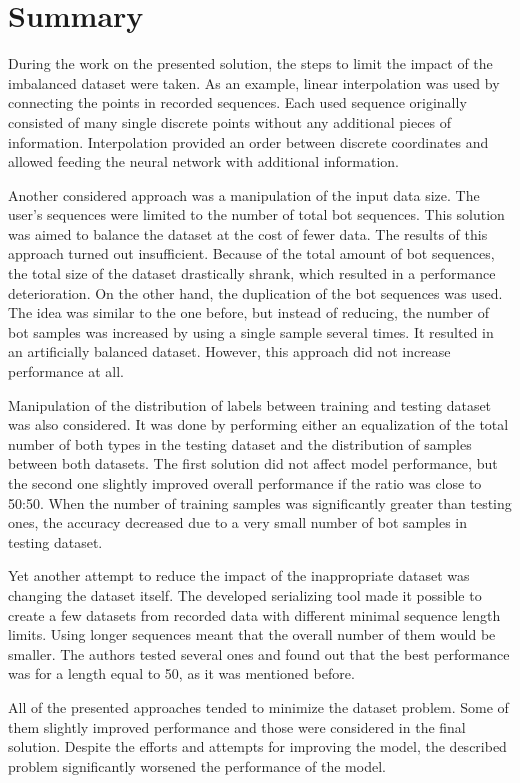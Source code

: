 \section{Summary}\label{sec:summary}
During the work on the presented solution, the steps to limit the impact of the imbalanced dataset were taken.
As an example, linear interpolation was used by connecting the points in recorded sequences.
Each used sequence originally consisted of many single discrete points without any additional pieces of information.
Interpolation provided an order between discrete coordinates and allowed feeding the neural network with additional information.

Another considered approach was a manipulation of the input data size.
The user's sequences were limited to the number of total bot sequences.
This solution was aimed to balance the dataset at the cost of fewer data.
The results of this approach turned out insufficient.
Because of the total amount of bot sequences, the total size of the dataset drastically shrank, which resulted in a performance deterioration.
On the other hand, the duplication of the bot sequences was used.
The idea was similar to the one before, but instead of reducing, the number of bot samples was increased by using a single sample several times.
It resulted in an artificially balanced dataset.
However, this approach did not increase performance at all.

Manipulation of the distribution of labels between training and testing dataset was also considered.
It was done by performing either an equalization of the total number of both types in the testing dataset and the distribution of samples between both datasets.
The first solution did not affect model performance, but the second one slightly improved overall performance if the ratio was close to 50:50.
When the number of training samples was significantly greater than testing ones, the accuracy decreased due to a very small number of bot samples in testing dataset.

Yet another attempt to reduce the impact of the inappropriate dataset was changing the dataset itself.
The developed serializing tool made it possible to create a few datasets from recorded data with different minimal sequence length limits.
Using longer sequences meant that the overall number of them would be smaller.
The authors tested several ones and found out that the best performance was for a length equal to 50, as it was mentioned before.

All of the presented approaches tended to minimize the dataset problem.
Some of them slightly improved performance and those were considered in the final solution.
Despite the efforts and attempts for improving the model, the described problem significantly worsened the performance of the model.
